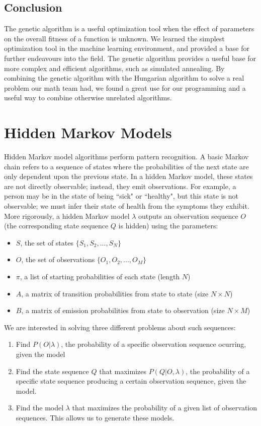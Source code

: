\documentclass[11pt,a4paper]{article}
\begin{document}
\subsection{Conclusion}
\label{Genetic Algorithms:Conclusion}

The genetic algorithm is a useful optimization tool when the effect of parameters on the overall fitness of a function is unknown. We learned the simplest optimization tool in the machine learning environment, and provided a base for further endeavours into the field. The genetic algorithm provides a useful base for more complex and efficient algorithms, such as simulated annealing. By combining the genetic algorithm with the Hungarian algorithm to solve a real problem our math team had, we found a great use for our programming and a useful way to combine otherwise unrelated algorithms.

\section{Hidden Markov Models} 
\label{Hidden Markov Models}

Hidden Markov model algorithms perform pattern recognition. A basic Markov chain refers to a sequence of states where the probabilities of the next state are only dependent upon the previous state. In a hidden Markov model, these states are not directly observable; instead, they emit observations. For example, a person may be in the state of being ``sick" or ``healthy", but this state is not observable; we must infer their state of health from the symptoms they exhibit. More rigorously, a hidden Markov model $\lambda$ outputs an observation sequence $O$ (the corresponding state sequence $Q$ is hidden) using the parameters:

\begin{itemize}
\item $S$, the set of states $\{S_1, S_2, ... , S_N\}$
\item $O$, the set of observations $\{O_1, O_2, ... , O_M\}$
\item $\pi$, a list of starting probabilities of each state (length $N$)
\item $A$, a matrix of transition probabilities from state to state (size $N \times N$)
\item $B$, a matrix of emission probabilities from state to observation (size $N \times M$) 
\end{itemize}

We are interested in solving three different problems about such sequences:
\begin{enumerate}
\item Find $P(O|\lambda)$, the probability of a specific observation sequence ocurring, given the model
\item Find the state sequence $Q$ that maximizes $P(Q|O, \lambda)$, the probability of a specific state sequence producing a certain observation sequence, given the model.
\item Find the model $\lambda$ that maximizes the probability of a given list of observation sequences. This allows us to generate these models.
\end{enumerate}
\end{document}
